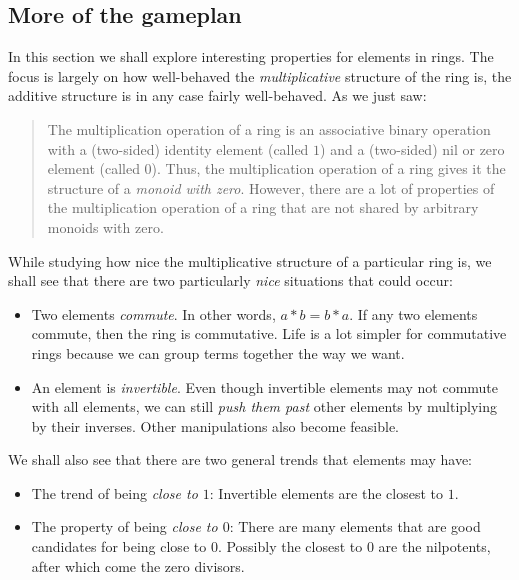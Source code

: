 \documentclass[a4paper]{amsart}
\begin{document}
\subsection{More of the gameplan}

In this section we shall explore interesting properties for elements
in rings. The focus is largely on how well-behaved the {\em
  multiplicative} structure of the ring is, the additive structure is
in any case fairly well-behaved. As we just saw:

\begin{quote}
  The multiplication operation of a ring is an associative binary
  operation with a (two-sided) identity element (called $1$) and a
  (two-sided) nil or zero element (called $0$). Thus, the
  multiplication operation of a ring gives it the structure of a {\em
    monoid with zero}. However, there are a lot of properties of the
  multiplication operation of a ring that are not shared by arbitrary
  monoids with zero.
\end{quote}

While studying how nice the multiplicative structure of a particular
ring is, we shall see that there are two particularly {\em nice}
situations that could occur:

\begin{itemize}

\item Two elements {\em commute}. In other words, $a * b = b * a$. If
  any two elements commute, then the ring is commutative. Life is a
  lot simpler for commutative rings because we can group terms
  together the way we want.

\item An element is {\em invertible}. Even though invertible elements
  may not commute with all elements, we can still {\em push them past}
  other elements by multiplying by their inverses. Other manipulations
  also become feasible.

\end{itemize}

We shall also see that there are two general trends that elements may
have:

\begin{itemize}

\item The trend of being {\em close to $1$}: Invertible elements are
  the closest to $1$.

\item The property of being {\em close to $0$}: There are many
  elements that are good candidates for being close to $0$. Possibly
  the closest to $0$ are the nilpotents, after which come the zero
  divisors.

\end{itemize}
\end{document}
